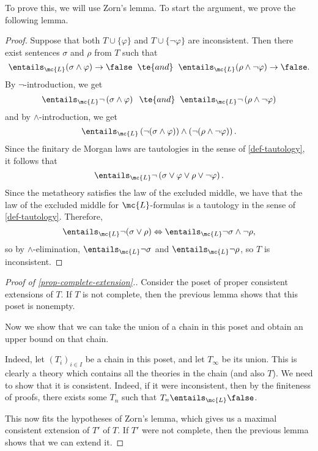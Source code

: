 \documentclass[11pt]{article}
\begin{document}

    To prove this, we will use Zorn's lemma. To start the argument, we prove the following lemma.


\begin{proof}
  Suppose that both $T \cup \{\varphi\}$ and $T \cup \{ \neg \varphi\}$ are inconsistent. Then there exist sentences $\sigma$ and $\rho$ from $T$ such that
  $$
\entails_{\mc{L}} (\sigma \wedge \varphi) \to \false \hspace{2mm} \te{ and } \hspace{2mm} \entails_{\mc{L}} (\rho \wedge \neg \varphi) \to \false.
$$
By $\neg$-introduction, we get
$$
\entails_{\mc{L}} \neg \left(\sigma \wedge \varphi\right) \hspace{2mm} \te{ and } \hspace{2mm} \entails_{\mc{L}} \neg \left(\rho \wedge \neg \varphi\right)
$$
and by $\wedge$-introduction, we get
$$
\entails_{\mc{L}} \left(\neg(\sigma \wedge \varphi) \right) \wedge \left(\neg (\rho \wedge \neg \varphi) \right).
$$
Since the finitary de Morgan laws are tautologies in the sense of \ref{def-tautology}, it follows that
$$
\entails_{\mc{L}} \neg \left(\sigma \lor \varphi \lor \rho \lor \neg \varphi\right).
$$
Since the metatheory satisfies the law of the excluded middle, we have that the law of the excluded middle for $\mc{L}$-formulas is a tautology in the sense of \ref{def-tautology}. Therefore,
$$
\entails_{\mc{L}} \neg(\sigma \lor \rho) \Leftrightarrow \entails_{\mc{L}} \neg \sigma \land \neg \rho,
$$
so by $\wedge$-elimination,
$\entails_{\mc{L}} \neg \sigma$ and $\entails_{\mc{L}} \neg \rho$, so $T$ is inconsistent.
\end{proof}


    \begin{proof}[Proof of \ref{prop-complete-extension}.]
      Consider the poset of proper consistent extensions of $T$. If $T$ is not complete, then the previous lemma shows that this poset is nonempty.

      Now we show that we can take the union of a chain in this poset and obtain an upper bound on that chain.

      Indeed, let $(T_i)_{i \in I}$ be a chain in this poset, and let $T_{\infty}$ be its union. This is clearly a theory which contains all the theories in the chain (and also $T$). We need to show that it is consistent. Indeed, if it were inconsistent, then by the finiteness of proofs, there exists some $T_n$ such that $T_n \entails_{\mc{L}} \false$.

      This now fits the hypotheses of Zorn's lemma, which gives us a maximal consistent extension of $T'$ of $T$. If $T'$ were not complete, then the previous lemma shows that we can extend it.
    \end{proof}
    
\end{document}
